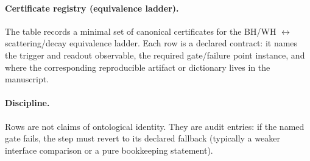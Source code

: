 \paragraph{Certificate registry (equivalence ladder).} \AuditTag The table records a minimal set of canonical certificates for the BH/WH $\leftrightarrow$ scattering/decay equivalence ladder. Each row is a declared contract: it names the trigger and readout observable, the required gate/failure point instance, and where the corresponding reproducible artifact or dictionary lives in the manuscript.
\paragraph{Discipline.} \AuditTag Rows are not claims of ontological identity. They are audit entries: if the named gate fails, the step must revert to its declared fallback (typically a weaker interface comparison or a pure bookkeeping statement).